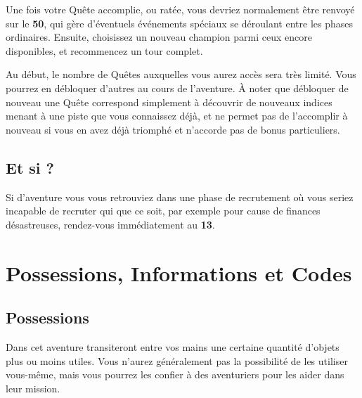\documentclass{report}
\begin{document}
Une fois votre Quête accomplie, ou ratée, vous devriez normalement être renvoyé sur le \textbf{50}, qui gère d'éventuels événements spéciaux se déroulant entre les phases ordinaires. Ensuite, choisissez un nouveau champion parmi ceux encore disponibles, et recommencez un tour complet.

Au début, le nombre de Quêtes auxquelles vous aurez accès sera très limité. Vous pourrez en débloquer d'autres au cours de l'aventure. À noter que débloquer de nouveau une Quête correspond simplement à découvrir de nouveaux indices menant à une piste que vous connaissez déjà, et ne permet pas de l'accomplir à nouveau si vous en avez déjà triomphé et n'accorde pas de bonus particuliers.

\subsection{Et si ?}

Si d'aventure vous vous retrouviez dans une phase de recrutement où vous seriez incapable de recruter qui que ce soit, par exemple pour cause de finances désastreuses, rendez-vous immédiatement au \textbf{13}.

\section{Possessions, Informations et Codes}

\subsection{Possessions}

Dans cet aventure transiteront entre vos mains une certaine quantité d'objets plus ou moins utiles. Vous n'aurez généralement pas la possibilité de les utiliser vous-même, mais vous pourrez les confier à des aventuriers pour les aider dans leur mission.
\end{document}
